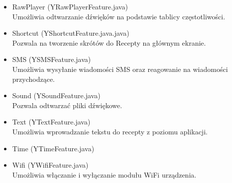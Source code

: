 \documentclass[11pt,a4paper,polish,thesis]{dcsbook}
\begin{document}
\begin{itemize}
\item{RawPlayer (YRawPlayerFeature.java)}\\
Umożliwia odtwarzanie dźwięków na podstawie tablicy częstotliwości.

\item{Shortcut (YShortcutFeature.java.java)}\\
Pozwala na tworzenie skrótów do Recepty na głównym ekranie.

\item{SMS (YSMSFeature.java)}\\
Umożliwia wysyłanie wiadomości SMS oraz reagowanie na wiadomości przychodzące.

\item{Sound (YSoundFeature.java)}\\
Pozwala odtwarzać pliki dźwiękowe.

\item{Text (YTextFeature.java)}\\
Umożliwia wprowadzanie tekstu do recepty z poziomu aplikacji.

\item{Time (YTimeFeature.java)}\\

\item{Wifi (YWifiFeature.java)}\\
Umożliwia włączanie i wyłączanie modułu WiFi urządzenia.

\end{itemize}
\end{document}
